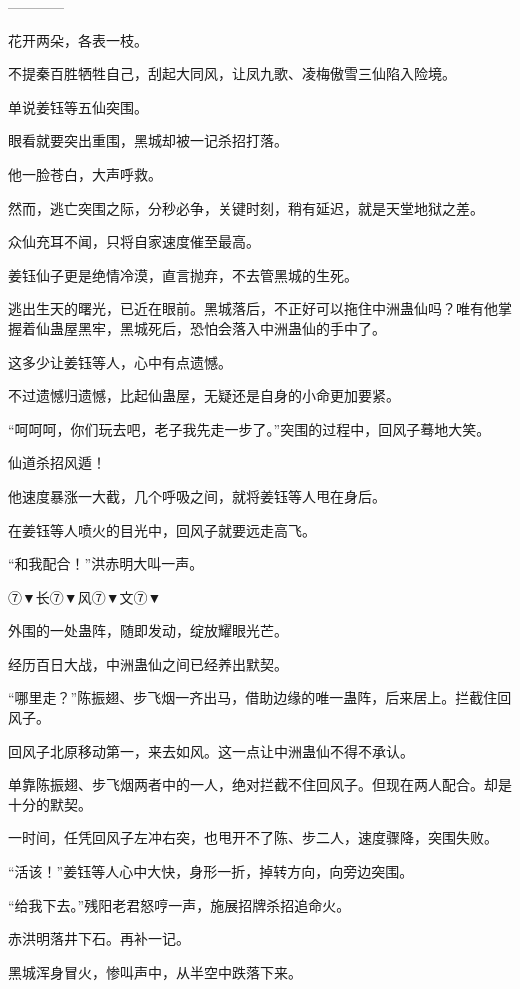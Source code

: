 
\begin{this_body}

------------

花开两朵，各表一枝。

不提秦百胜牺牲自己，刮起大同风，让凤九歌、凌梅傲雪三仙陷入险境。

单说姜钰等五仙突围。

眼看就要突出重围，黑城却被一记杀招打落。

他一脸苍白，大声呼救。

然而，逃亡突围之际，分秒必争，关键时刻，稍有延迟，就是天堂地狱之差。

众仙充耳不闻，只将自家速度催至最高。

姜钰仙子更是绝情冷漠，直言抛弃，不去管黑城的生死。

逃出生天的曙光，已近在眼前。黑城落后，不正好可以拖住中洲蛊仙吗？唯有他掌握着仙蛊屋黑牢，黑城死后，恐怕会落入中洲蛊仙的手中了。

这多少让姜钰等人，心中有点遗憾。

不过遗憾归遗憾，比起仙蛊屋，无疑还是自身的小命更加要紧。

“呵呵呵，你们玩去吧，老子我先走一步了。”突围的过程中，回风子蓦地大笑。

仙道杀招风遁！

他速度暴涨一大截，几个呼吸之间，就将姜钰等人甩在身后。

在姜钰等人喷火的目光中，回风子就要远走高飞。

“和我配合！”洪赤明大叫一声。

⑦▼长⑦▼风⑦▼文⑦▼

外围的一处蛊阵，随即发动，绽放耀眼光芒。

经历百日大战，中洲蛊仙之间已经养出默契。

“哪里走？”陈振翅、步飞烟一齐出马，借助边缘的唯一蛊阵，后来居上。拦截住回风子。

回风子北原移动第一，来去如风。这一点让中洲蛊仙不得不承认。

单靠陈振翅、步飞烟两者中的一人，绝对拦截不住回风子。但现在两人配合。却是十分的默契。

一时间，任凭回风子左冲右突，也甩开不了陈、步二人，速度骤降，突围失败。

“活该！”姜钰等人心中大快，身形一折，掉转方向，向旁边突围。

“给我下去。”残阳老君怒哼一声，施展招牌杀招追命火。

赤洪明落井下石。再补一记。

黑城浑身冒火，惨叫声中，从半空中跌落下来。


\end{this_body}
